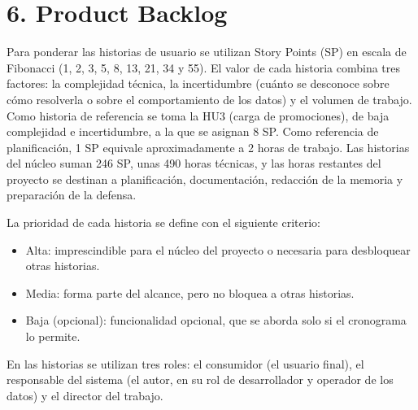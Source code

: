 \documentclass[
11pt, %
]{charter}
\begin{document}
\section{6. Product Backlog}
\label{sec:backlog}

Para ponderar las historias de usuario se utilizan Story Points (SP) en escala de Fibonacci (1, 2, 3, 5, 8, 13, 21, 34 y 55). El valor de cada historia combina tres factores: la complejidad técnica, la incertidumbre (cuánto se desconoce sobre cómo resolverla o sobre el comportamiento de los datos) y el volumen de trabajo. Como historia de referencia se toma la HU3 (carga de promociones), de baja complejidad e incertidumbre, a la que se asignan 8 SP. Como referencia de planificación, 1 SP equivale aproximadamente a 2 horas de trabajo. Las historias del núcleo suman 246 SP, unas 490 horas técnicas, y las horas restantes del proyecto se destinan a planificación, documentación, redacción de la memoria y preparación de la defensa.

La prioridad de cada historia se define con el siguiente criterio:

\begin{itemize}
	\item Alta: imprescindible para el núcleo del proyecto o necesaria para desbloquear otras historias.
	\item Media: forma parte del alcance, pero no bloquea a otras historias.
	\item Baja (opcional): funcionalidad opcional, que se aborda solo si el cronograma lo permite.
\end{itemize}

En las historias se utilizan tres roles: el consumidor (el usuario final), el responsable del sistema (el autor, en su rol de desarrollador y operador de los datos) y el director del trabajo.
\end{document}
